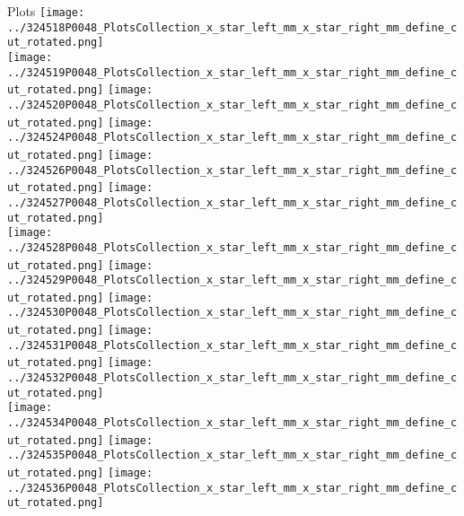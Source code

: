\documentclass{beamer}
\begin{document}
\begin{frame}
\begin{block}{Plots}
                \texttt{[image: ../324518P0048\_PlotsCollection\_x\_star\_left\_mm\_x\_star\_right\_mm\_define\_cut\_rotated.png]}\\
                \texttt{[image: ../324519P0048\_PlotsCollection\_x\_star\_left\_mm\_x\_star\_right\_mm\_define\_cut\_rotated.png]}
                \texttt{[image: ../324520P0048\_PlotsCollection\_x\_star\_left\_mm\_x\_star\_right\_mm\_define\_cut\_rotated.png]}
                \texttt{[image: ../324524P0048\_PlotsCollection\_x\_star\_left\_mm\_x\_star\_right\_mm\_define\_cut\_rotated.png]}
                \texttt{[image: ../324526P0048\_PlotsCollection\_x\_star\_left\_mm\_x\_star\_right\_mm\_define\_cut\_rotated.png]}
                \texttt{[image: ../324527P0048\_PlotsCollection\_x\_star\_left\_mm\_x\_star\_right\_mm\_define\_cut\_rotated.png]}\\
                \texttt{[image: ../324528P0048\_PlotsCollection\_x\_star\_left\_mm\_x\_star\_right\_mm\_define\_cut\_rotated.png]}
                \texttt{[image: ../324529P0048\_PlotsCollection\_x\_star\_left\_mm\_x\_star\_right\_mm\_define\_cut\_rotated.png]}
                \texttt{[image: ../324530P0048\_PlotsCollection\_x\_star\_left\_mm\_x\_star\_right\_mm\_define\_cut\_rotated.png]}
                \texttt{[image: ../324531P0048\_PlotsCollection\_x\_star\_left\_mm\_x\_star\_right\_mm\_define\_cut\_rotated.png]}
                \texttt{[image: ../324532P0048\_PlotsCollection\_x\_star\_left\_mm\_x\_star\_right\_mm\_define\_cut\_rotated.png]}\\
                \texttt{[image: ../324534P0048\_PlotsCollection\_x\_star\_left\_mm\_x\_star\_right\_mm\_define\_cut\_rotated.png]}
                \texttt{[image: ../324535P0048\_PlotsCollection\_x\_star\_left\_mm\_x\_star\_right\_mm\_define\_cut\_rotated.png]}
                \texttt{[image: ../324536P0048\_PlotsCollection\_x\_star\_left\_mm\_x\_star\_right\_mm\_define\_cut\_rotated.png]}

        \end{block}
\end{frame}
\end{document}
